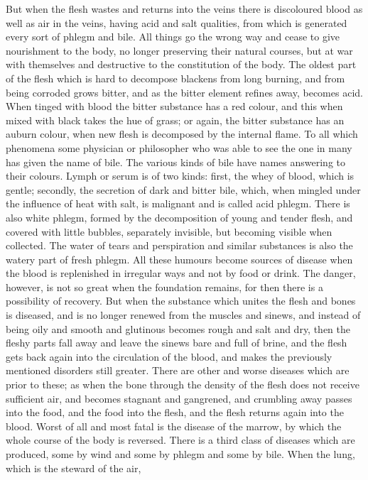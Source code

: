 But when the flesh wastes and returns into the veins there is discoloured
blood as well as air in the veins, having acid and salt qualities, from
which is generated every sort of phlegm and bile. All things go the wrong
way and cease to give nourishment to the body, no longer preserving their
natural courses, but at war with themselves and destructive to the
constitution of the body. The oldest part of the flesh which is hard to
decompose blackens from long burning, and from being corroded grows
bitter, and as the bitter element refines away, becomes acid. When tinged
with blood the bitter substance has a red colour, and this when mixed with
black takes the hue of grass; or again, the bitter substance has an auburn
colour, when new flesh is decomposed by the internal flame. To all which
phenomena some physician or philosopher who was able to see the one in
many has given the name of bile. The various kinds of bile have names
answering to their colours. Lymph or serum is of two kinds: first, the
whey of blood, which is gentle; secondly, the secretion of dark and bitter
bile, which, when mingled under the influence of heat with salt, is
malignant and is called acid phlegm. There is also white phlegm, formed by
the decomposition of young and tender flesh, and covered with little
bubbles, separately invisible, but becoming visible when collected. The
water of tears and perspiration and similar substances is also the watery
part of fresh phlegm. All these humours become sources of disease when the
blood is replenished in irregular ways and not by food or drink. The
danger, however, is not so great when the foundation remains, for then
there is a possibility of recovery. But when the substance which unites
the flesh and bones is diseased, and is no longer renewed from the muscles
and sinews, and instead of being oily and smooth and glutinous becomes
rough and salt and dry, then the fleshy parts fall away and leave the
sinews bare and full of brine, and the flesh gets back again into the
circulation of the blood, and makes the previously mentioned disorders
still greater. There are other and worse diseases which are prior to
these; as when the bone through the density of the flesh does not receive
sufficient air, and becomes stagnant and gangrened, and crumbling away
passes into the food, and the food into the flesh, and the flesh returns
again into the blood. Worst of all and most fatal is the disease of the
marrow, by which the whole course of the body is reversed. There is a
third class of diseases which are produced, some by wind and some by
phlegm and some by bile. When the lung, which is the steward of the air,
